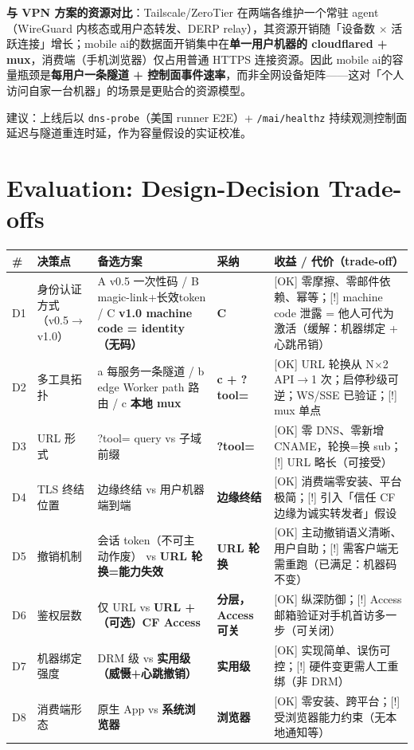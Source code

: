 \documentclass[10pt,a4paper]{article}
\newcommand{\sys}{mobile ai}
\begin{document}
\noindent\textbf{与 VPN 方案的资源对比}：Tailscale/ZeroTier 在两端各维护一个常驻 agent（WireGuard 内核态或用户态转发、DERP relay），其资源开销随「设备数 $\times$ 活跃连接」增长；\sys 的数据面开销集中在\textbf{单一用户机器的 cloudflared + mux}，消费端（手机浏览器）仅占用普通 HTTPS 连接资源。因此 \sys 的容量瓶颈是\textbf{每用户一条隧道 + 控制面事件速率}，而非全网设备矩阵——这对「个人访问自家一台机器」的场景是更贴合的资源模型。

\noindent 建议：上线后以 \texttt{dns-probe}（美国 runner E2E）+ \texttt{/mai/healthz} 持续观测控制面延迟与隧道重连时延，作为容量假设的实证校准。

\section{Evaluation: Design-Decision Trade-offs}

\begin{longtable}{@{}p{0.6cm}p{2.3cm}p{3.8cm}p{2.5cm}p{5.3cm}@{}}
\toprule
\# & 决策点 & 备选方案 & 采纳 & 收益 / 代价（trade-off）\\
\midrule
D1 & 身份认证方式（v0.5$\rightarrow$v1.0） & A v0.5 一次性码 / B magic-link+长效token / C \textbf{v1.0 machine code = identity（无码）} & \textbf{C} & [OK] 零摩擦、零邮件依赖、幂等；[!] machine code 泄露 = 他人可代为激活（缓解：机器绑定 + 心跳吊销）\\
\addlinespace[2pt]
D2 & 多工具拓扑 & a 每服务一条隧道 / b edge Worker path 路由 / c \textbf{本地 mux} & \textbf{c + ?tool=} & [OK] URL 轮换从 N$\times$2 API$\rightarrow$1 次；启停秒级可逆；WS/SSE 已验证；[!] mux 单点\\
\addlinespace[2pt]
D3 & URL 形式 & ?tool= query vs 子域前缀 & \textbf{?tool=} & [OK] 零 DNS、零新增 CNAME，轮换=换 sub；[!] URL 略长（可接受）\\
\addlinespace[2pt]
D4 & TLS 终结位置 & 边缘终结 vs 用户机器端到端 & \textbf{边缘终结} & [OK] 消费端零安装、平台极简；[!] 引入「信任 CF 边缘为诚实转发者」假设\\
\addlinespace[2pt]
D5 & 撤销机制 & 会话 token（不可主动作废） vs \textbf{URL 轮换=能力失效} & \textbf{URL 轮换} & [OK] 主动撤销语义清晰、用户自助；[!] 需客户端无需重跑（已满足：机器码不变）\\
\addlinespace[2pt]
D6 & 鉴权层数 & 仅 URL vs \textbf{URL +（可选）CF Access} & \textbf{分层，Access 可关} & [OK] 纵深防御；[!] Access 邮箱验证对手机首访多一步（可关闭）\\
\addlinespace[2pt]
D7 & 机器绑定强度 & DRM 级 vs \textbf{实用级（威慑+心跳撤销）} & \textbf{实用级} & [OK] 实现简单、误伤可控；[!] 硬件变更需人工重绑（非 DRM）\\
\addlinespace[2pt]
D8 & 消费端形态 & 原生 App vs \textbf{系统浏览器} & \textbf{浏览器} & [OK] 零安装、跨平台；[!] 受浏览器能力约束（无本地通知等）\\
\bottomrule
\end{longtable}
\end{document}
